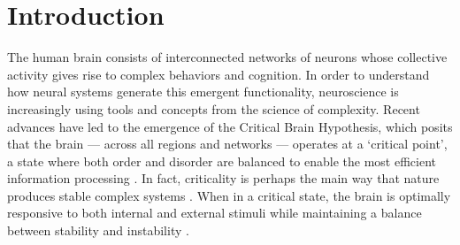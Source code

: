 \documentclass[
true
]{sn-jnl}
\begin{document}
\section{Introduction}\label{introduction}

The human brain consists of interconnected networks of neurons whose
collective activity gives rise to complex behaviors and cognition. In
order to understand how neural systems generate this emergent
functionality, neuroscience is increasingly using tools and concepts
from the science of complexity. Recent advances have led to the
emergence of the Critical Brain Hypothesis, which posits that the brain
--- across all regions and networks --- operates at a `critical point',
a state where both order and disorder are balanced to enable the most
efficient information processing
\citep{decoRestingBrainsNever2013, beggsBeingCriticalCriticality2012, barangerChaosComplexityEntropy2000, bassettUnderstandingComplexityHuman2011, zimmernWhyBrainCriticality2020, liangExcitationInhibitionBalance2024, poilCriticalStateDynamicsAvalanches2012, lombardiBalanceExcitationInhibition2017, baumgartenCriticalExcitationinhibitionBalance2019, bruiningMeasurementExcitationinhibitionRatio2020, trakoshisIntrinsicExcitationinhibitionImbalance, gaoInferringSynapticExcitation2017, tianTheoreticalFoundationsStudying2022, rubinovNeurobiologicallyRealisticDeterminants2011}.
In fact, criticality is perhaps the main way that nature produces stable
complex systems
\citep{langtonComputationEdgeChaos1990, bakHowNatureWorks1996}. When in
a critical state, the brain is optimally responsive to both internal and
external stimuli while maintaining a balance between stability and
instability
\citep{decoRestingBrainsNever2013, beggsBeingCriticalCriticality2012, tianTheoreticalFoundationsStudying2022, rubinovNeurobiologicallyRealisticDeterminants2011}.
\end{document}

